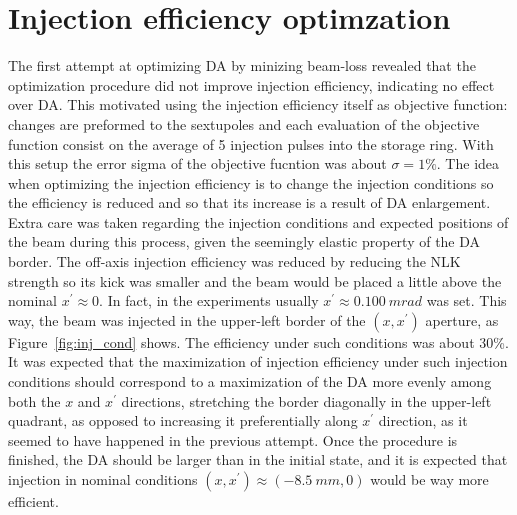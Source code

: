 
\section{Injection efficiency optimzation}
The first attempt at optimizing DA by minizing beam-loss revealed that the optimization procedure did not improve injection efficiency, indicating no effect over DA. This motivated using the injection efficiency itself as objective function: changes are preformed to the sextupoles and each evaluation of the objective function consist on the average of 5 injection pulses into the storage ring. With this setup the error sigma of the objective fucntion was about $\sigma=1\%$.
The idea when optimizing the injection efficiency is to change the injection conditions so the efficiency is reduced and so that its increase is a result of DA enlargement. Extra care was taken regarding the injection conditions and expected positions of the beam during this process, given the seemingly elastic property of the DA border. The off-axis injection efficiency was reduced by reducing the NLK strength so its kick was smaller and the beam would be placed a little above the nominal $x^\prime\approx 0$. In fact, in the experiments usually $x^\prime\approx 0.100~\unit{mrad}$ was set. This way, the beam was injected in the upper-left border of the  $(x,x^\prime)$ aperture, as Figure~\ref{fig:inj_cond} shows. The efficiency under such conditions was about 30\%. It was expected that the maximization of injection efficiency under such injection conditions should correspond to a maximization of the DA more evenly among both the $x$ and $x^{\prime}$ directions, stretching the border diagonally in the upper-left quadrant, as opposed to increasing it preferentially along $x^\prime$ direction, as it seemed to have happened in the previous attempt. Once the procedure is finished, the DA should be larger than in the initial state, and it is expected that injection in nominal conditions $(x, x^\prime)\approx(-8.5~\unit{mm}, 0)$ would be way more efficient.
